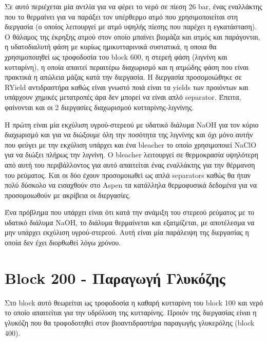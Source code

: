\documentclass[11pt]{article}
\begin{document}
Σε αυτό περιέχεται μία αντλία για να φέρει το νερό σε πίεση 26 bar, ένας εναλλάκτης που το θερμαίνει για να παράξει τον υπέρθερμο ατμό που χρησιμοποιείται στη διεργασία (ο οποίος λειτουργεί με ατμό υψηλής πίεσης που παρέχει η εγκατάσταση). Ο θάλαμος της έκρηξης ατμού στον οποίο μπαίνει βιομάζα και ατμός και παράγονται, η υδατοδιαλυτή φάση με κυρίως ημικυτταρινικά συστατικά, η οποια θα χρησιμοποιηθεί ως τροφοδοσία του block 600, η στερεή φάση (λιγνίνη και κυτταρίνη), η οποία απαιτεί περαιτέρω διαχωρισμό και η ατμώδης φάση που είναι πρακτικά η απώλεια μάζας κατά την διεργασία. Η διεργασία προσομοιώθηκε σε RYield αντιδραστήρα καθώς είναι γνωστό ποιά είναι τα yields των προιόντων και υπάρχουν χημικές μετατροπές άρα δεν μπορεί να είναι απλό separator. Έπειτα, φαίνονται και οι 2 διεργασίες διαχωρισμού κυτταρίνης-λιγνίνης.

Η πρώτη είναι μία εκχύλιση υγρού-στερεού με υδατικό διάλυμα NaOH για τον κύριο διαχωρισμό και για να διώξουμε όλη την ποσότητα της λιγνίνης και όχι μόνο αυτήν που φεύγει με την εκχύλιση υπάρχει και ένα bleacher το οποίο χρησιμοποιεί NaClO για να διώξει πλήρως την λιγνίνη. Ο bleacher λειτουργεί σε θερμοκρασία υψηλότερη από αυτή του περιβάλλοντος για αυτό απαιτείται ένας εναλλάκτης για την θέρμανση του ρεύματος. Και οι δύο έχουν προσομοιωθεί ως απλά separators καθώς θα ήταν πολύ δύσκολο να εισαχθούν στο Aspen τα κατάλληλα θερμοφυσικά δεδομένα για να προσομοιωθούν με ακρίβεια οι διεργασίες.

Ένα πρόβλημα που υπάρχει είναι ότι κατά την ανάμιξη του στερεού ρεύματος με το υδατικό διάλυμα NaOH, το διάλυμα θερμαίνεται και εξατμίζεται, με αποτέλεσμα να μην υπάρχει εκχύλιση υγρού-στερεού. Αυτή είναι μία παράλειψη της διεργασίας η οποία δεν έχει διορθωθεί λόγω χρόνου.

\section{Block 200 - Παραγωγή Γλυκόζης}
\label{sec:org6d7da72}
Στο block αυτό θεωρείται ως τροφοδοσία η καθαρή κυτταρίνη του block 100 και νερό το οποίο απαιτείται για την υδρόλυση της κυτταρίνης. Προιόν της διεργασίας είναι η γλυκόζη που θα τροφοδοτηθεί στον βιοαντιδραστήρα παραγωγής γλυκερόλης (block 400).
\end{document}
